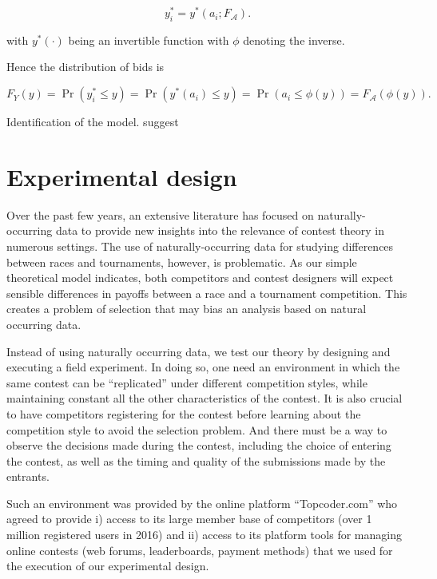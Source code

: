 \documentclass[11pt, titlepage]{article}
\begin{document}
\begin{equation}
  y_i^* = y^*(a_i; F_{\mathcal{A}}). 
\end{equation}

with \(y^*(\cdot)\) being an invertible function with \(\phi\) denoting
the inverse.

Hence the distribution of bids is

\begin{equation}
F_{Y}(y) = \Pr(y_i^* \leq y) 
        = \Pr(y^*(a_i) \leq y) 
        = \Pr(a_i \leq \phi(y)) 
        = F_\mathcal{A}( \phi(y)).
\end{equation}

Identification of the model. suggest

\section{Experimental design}\label{experimental-design}

Over the past few years, an extensive literature has focused on
naturally-occurring data to provide new insights into the relevance of
contest theory in numerous settings. The use of naturally-occurring data
for studying differences between races and tournaments, however, is
problematic. As our simple theoretical model indicates, both competitors
and contest designers will expect sensible differences in payoffs
between a race and a tournament competition. This creates a problem of
selection that may bias an analysis based on natural occurring data.

Instead of using naturally occurring data, we test our theory by
designing and executing a field experiment. In doing so, one need an
environment in which the same contest can be ``replicated'' under
different competition styles, while maintaining constant all the other
characteristics of the contest. It is also crucial to have competitors
registering for the contest before learning about the competition style
to avoid the selection problem. And there must be a way to observe the
decisions made during the contest, including the choice of entering the
contest, as well as the timing and quality of the submissions made by
the entrants.

Such an environment was provided by the online platform ``Topcoder.com''
who agreed to provide i) access to its large member base of competitors
(over 1 million registered users in 2016) and ii) access to its platform
tools for managing online contests (web forums, leaderboards, payment
methods) that we used for the execution of our experimental design.
\end{document}
